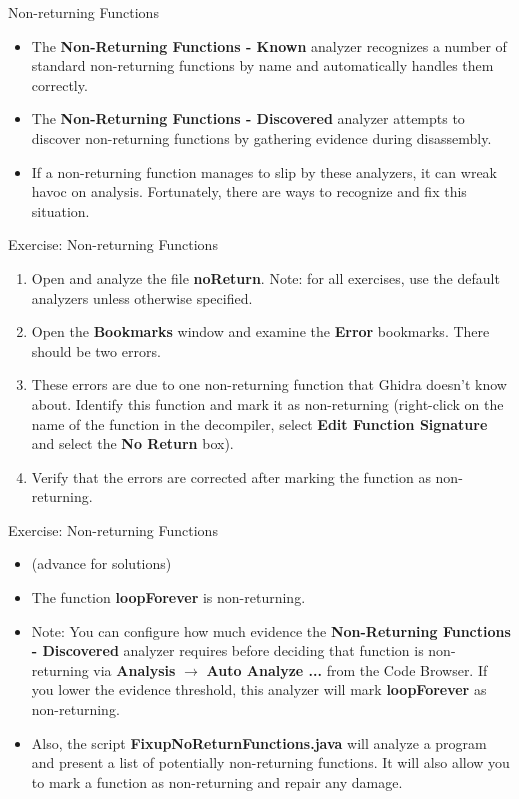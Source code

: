 \documentclass{beamer}
\begin{document}
\begin{frame}
\begin{block}{Non-returning Functions}
\begin{itemize}
\item The \textbf{Non-Returning Functions - Known} analyzer recognizes a number of standard non-returning functions by name and automatically handles them correctly.
\item The \textbf{Non-Returning Functions - Discovered} analyzer attempts to discover non-returning functions by gathering evidence during disassembly.
\item If a non-returning function manages to slip by these analyzers, it can wreak havoc on analysis.  Fortunately, there are ways to recognize and fix this situation.
\end{itemize}
\end{block}
\end{frame}

\begin{frame}
\begin{block}{Exercise: Non-returning Functions}
\begin{enumerate}
\item Open and analyze the file \textbf{noReturn}. Note: for all exercises, use the default analyzers unless otherwise specified.
\item Open the \textbf{Bookmarks} window and examine the \textbf{Error} bookmarks. There should be two errors.
\item These errors are due to one non-returning function that Ghidra doesn't know about.  Identify this function and mark it as non-returning (right-click on the name of the function in
the decompiler, select \textbf{Edit Function Signature} and select the \textbf{No Return} box).
\item Verify that the errors are corrected after marking the function as non-returning.
\end{enumerate}
\end{block}
\end{frame}

\begin{frame}
\begin{block}{Exercise: Non-returning Functions}
\begin{itemize}
\item[] (advance for solutions)
\pause
\item The function \textbf{loopForever} is non-returning. 
\item Note: You can configure how much evidence the \textbf{Non-Returning Functions - Discovered} analyzer requires before deciding that function is non-returning via 
\textbf{Analysis} $\rightarrow$ \textbf{Auto Analyze ...} from the Code Browser. If you lower the evidence threshold, this analyzer will mark \textbf{loopForever} as
non-returning.
\item Also, the script \textbf{FixupNoReturnFunctions.java} will analyze a program and present a list of potentially non-returning functions.
It will also allow you to mark a function as non-returning and repair any damage.
\end{itemize}
\end{block}
\end{frame}
\end{document}
